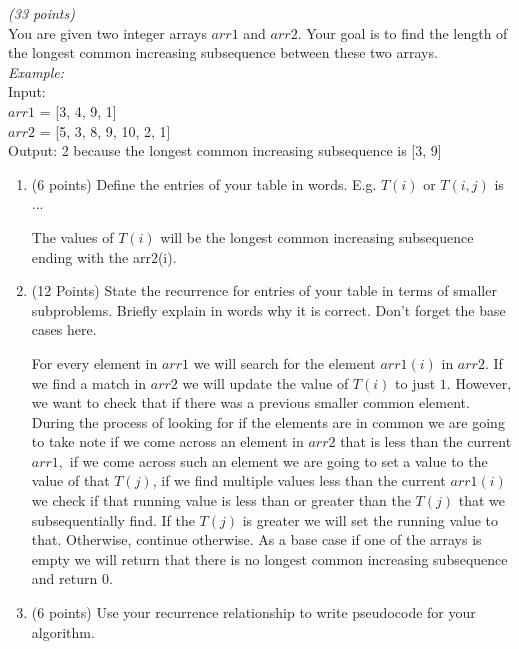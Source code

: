 \documentclass{article}
\newcounter{ProblemCounter}
\newenvironment{problem}[1][Problem]{
 \begin{trivlist}
 \item[\hskip \labelsep {\bfseries #1}\hskip \labelsep {%
 \bfseries \theProblemCounter.%
 \stepcounter{ProblemCounter}%
 }]
}{
 \end{trivlist}
}
\begin{document}
\begin{problem}\textit{(33 points)}\\
You are given two integer arrays $arr1$ and $arr2$. Your goal is to find the length of the longest common increasing subsequence between these two arrays.\\

\noindent \textit{Example:}\\
Input:\\
$arr1$ = [3, 4, 9, 1]\\
$arr2$ = [5, 3, 8, 9, 10, 2, 1]\\
Output: 2 because the longest common increasing subsequence is [3, 9]

\begin{enumerate}[label=\textbf{\alph*.)}]
    \item (6 points) Define the entries of your table in words. E.g. $T(i)$ or $T(i, j)$ is ...
    
    The values of $T(i)$ will be the longest common increasing subsequence ending with the arr2(i).
    
    \item (12 Points) State the recurrence for entries of your table in terms of smaller subproblems. Briefly explain in words why it is correct. Don't forget the base cases here.
    
    For every element in $arr1$ we will search for the element $arr1(i)$ in $arr2.$ If we find a match in $arr2$ we will update the value of $T(i)$ to just $1$. However, we want to check that if there was a previous smaller common element. During the process of looking for if the elements are in common we are going to take note if we come across an element in $arr2$ that is less than the current $arr1,$ if we come across such an element we are going to set a value to the value of that $T(j)$, if we find multiple values less than the current $arr1(i)$ we check if that running value is less than or greater than the $T(j)$ that we subsequentially find. If the $T(j)$ is greater we will set the running value to that. Otherwise, continue otherwise. As a base case if one of the arrays is empty we will return that there is no longest common increasing subsequence and return 0.
    
    \item (6 points) Use your recurrence relationship to write pseudocode for your algorithm.
    

\end{enumerate}
\end{problem}
\end{document}
